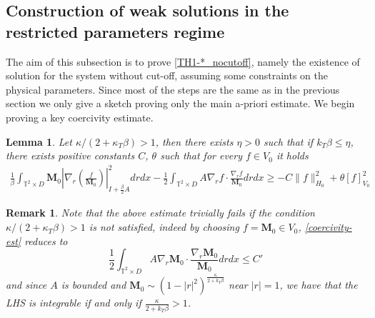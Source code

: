 \documentclass[a4paper,12pt, reqno]{amsart}
\newtheorem{lemma}[theorem]{Lemma}
\newtheorem{remark}[theorem]{Remark}
\newcommand{\T}{\mathbb{T}}
\newcommand{\M}{\mathbf{M}}
\renewcommand{\k}{\kappa}
\begin{document}
         \subsection{Construction of weak solutions in the restricted parameters regime}\label{sec:ex_nocutoff}
         The aim of this subsection is to prove \autoref{TH1-*_nocutoff}, namely the existence of solution for the system without cut-off, assuming some constraints on the physical parameters. Since most of the steps are the same as in the previous section we only give a sketch proving only the main a-priori estimate. We begin proving a key coercivity estimate. 
         \begin{lemma}\label{lem:coercivity_est}
             Let $\kappa/(2+ \k_T \beta)> 1$, then there exists $\eta >0$ such that if $k_T\beta \le \eta$, there exists positive constants $C$, $\theta$ such that for every $f\in V_0$ it holds 
             \begin{align}\label{coercivity-est}
    \frac{1}{\beta}\int_{\T^2 \times D} \M_0 \left| \nabla_r \left(\frac{f}{\M_0}\right)\right|_{I+ \frac{\beta}{2}A}^2 drdx - \frac{1}{2}\int_{\T^2 \times D} A \nabla_r f \cdot \frac{\nabla_r f}{\M_0}drdx \ge -C \|f\|^2_{H_0} + \theta [f]^2_{V_0}
\end{align}
         \end{lemma}
\begin{remark}\label{rem:coercivity_fails}
Note that the above estimate trivially fails if the condition $\kappa/(2+ \k_T \beta)> 1$ is not satisfied, indeed by choosing $f=\M_0 \in V_0$, \eqref{coercivity-est}  reduces to 
$$ \frac{1}{2}\int_{\T^2 \times D} A \nabla_r \M_0 \cdot \frac{\nabla_r \M_0}{\M_0}drdx \le C'$$
and since $A$ is bounded and $\M_0 \sim (1-|r|^2)^{\frac{\kappa}{2+k_T \beta}}$ near $|r|=1$, we have that the LHS is integrable if and only if $\frac{\kappa}{2 + k_T \beta} > 1$. 
         \end{remark}
\end{document}
